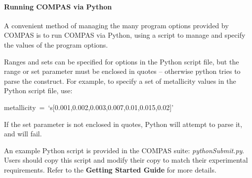 \paragraph{Running COMPAS via Python}\label{sec:PythonSubmit}\mbox{}

A convenient method of managing the many program options provided by COMPAS is to run COMPAS via Python, using a script to manage and specify the values of the program options.

Ranges and sets can be specified for options in the Python script file, but the range or set parameter must be enclosed in quotes – otherwise python tries to parse the construct. For example, to specify a set of metallicity values in the Python script file, use:

\bigskip
\tabto{3em}metallicity~=~‘s[0.001,0.002,0.003,0.007,0.01,0.015,0.02]’

\bigskip
If the set parameter is not enclosed in quotes, Python will attempt to parse it, and will fail.

\bigskip
An example Python script is provided in the COMPAS suite: \textit{pythonSubmit.py}. Users should copy this script and modify their copy to match their experimental requirements. Refer to the \textbf{Getting Started Guide} for more details.




